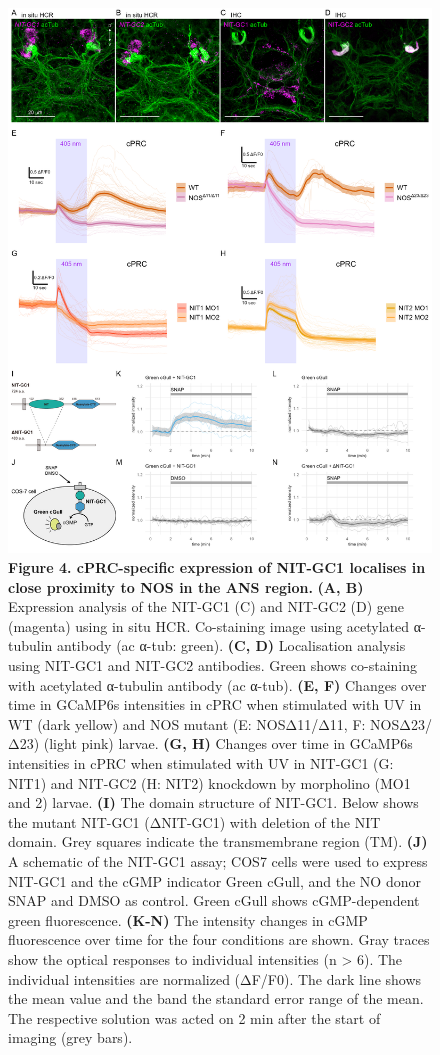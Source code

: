 \documentclass[
  10pt,
  onecolumn]{article}
\begin{document}
\begin{figure}
\centering
\includegraphics[width=1\textwidth,height=\textheight]{../figures/Fig4.png}
\caption{\textbf{Figure 4. cPRC-specific expression of NIT-GC1 localises
in close proximity to NOS in the ANS region.} \textbf{(A, B)} Expression
analysis of the NIT-GC1 (C) and NIT-GC2 (D) gene (magenta) using in situ
HCR. Co-staining image using acetylated α-tubulin antibody (ac α-tub:
green). \textbf{(C, D)} Localisation analysis using NIT-GC1 and NIT-GC2
antibodies. Green shows co-staining with acetylated α-tubulin antibody
(ac α-tub). \textbf{(E, F)} Changes over time in GCaMP6s intensities in
cPRC when stimulated with UV in WT (dark yellow) and NOS mutant (E:
NOSΔ11/Δ11, F: NOSΔ23/Δ23) (light pink) larvae. \textbf{(G, H)} Changes
over time in GCaMP6s intensities in cPRC when stimulated with UV in
NIT-GC1 (G: NIT1) and NIT-GC2 (H: NIT2) knockdown by morpholino (MO1 and
2) larvae. \textbf{(I)} The domain structure of NIT-GC1. Below shows the
mutant NIT-GC1 (ΔNIT-GC1) with deletion of the NIT domain. Grey squares
indicate the transmembrane region (TM). \textbf{(J)} A schematic of the
NIT-GC1 assay; COS7 cells were used to express NIT-GC1 and the cGMP
indicator Green cGull, and the NO donor SNAP and DMSO as control. Green
cGull shows cGMP-dependent green fluorescence. \textbf{(K-N)} The
intensity changes in cGMP fluorescence over time for the four conditions
are shown. Gray traces show the optical responses to individual
intensities (n \textgreater{} 6). The individual intensities are
normalized (ΔF/F0). The dark line shows the mean value and the band the
standard error range of the mean. The respective solution was acted on 2
min after the start of imaging (grey bars).}
\end{figure}
\end{document}
